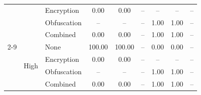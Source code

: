 \begin{table}[!t]
\begin{tabular}{lllccc ccc}
 &  & Encryption & \cellcolor[gray]{0.70}0.00 & \cellcolor[gray]{0.70}0.00 & -- & -- & -- & -- \\
 &  & Obfuscation & -- & -- & -- & \cellcolor[gray]{0.70}1.00 & \cellcolor[gray]{0.70}1.00 & -- \\
 &  & Combined & \cellcolor[gray]{0.70}0.00 & \cellcolor[gray]{0.70}0.00 & -- & \cellcolor[gray]{0.70}1.00 & \cellcolor[gray]{0.70}1.00 & -- \\
\cmidrule(lr){2-9}
 & \multirow{4}{*}{High} & None & \cellcolor[gray]{0.70}100.00 & \cellcolor[gray]{0.70}100.00 & -- & \cellcolor[gray]{0.70}0.00 & \cellcolor[gray]{0.70}0.00 & -- \\
 &  & Encryption & \cellcolor[gray]{0.70}0.00 & \cellcolor[gray]{0.70}0.00 & -- & -- & -- & -- \\
 &  & Obfuscation & -- & -- & -- & \cellcolor[gray]{0.70}1.00 & \cellcolor[gray]{0.70}1.00 & -- \\
 &  & Combined & \cellcolor[gray]{0.70}0.00 & \cellcolor[gray]{0.70}0.00 & -- & \cellcolor[gray]{0.70}1.00 & \cellcolor[gray]{0.70}1.00 & -- \\
\bottomrule
\end{tabular}
\end{table}
